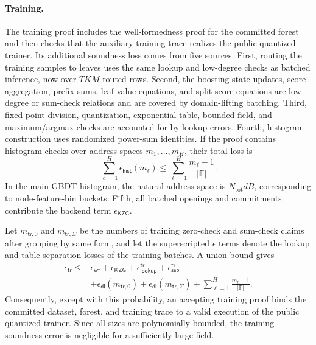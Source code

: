 \paragraph{Training.}
The training proof includes the well-formedness proof for the committed forest
and then checks that the auxiliary training trace realizes the public
quantized trainer.  Its additional soundness loss comes from five sources.
First, routing the training samples to leaves uses the same lookup and
low-degree checks as batched inference, now over $TKM$ routed rows.  Second,
the boosting-state updates, score aggregation, prefix sums, leaf-value
equations, and split-score equations are low-degree or sum-check relations and
are covered by domain-lifting batching.  Third, fixed-point division,
quantization, exponential-table, bounded-field, and maximum/argmax checks are
accounted for by lookup errors.  Fourth, histogram construction uses randomized
power-sum identities.  If the proof contains histogram checks over address
spaces $m_1,\ldots,m_H$, their total loss is
\[
    \sum_{\ell=1}^{H}\epsilon_{\mathsf{hist}}(m_\ell)
    \leq
    \sum_{\ell=1}^{H}\frac{m_\ell-1}{|\mathbb{F}|}.
\]
In the main GBDT histogram, the natural address space is
$N_{\mathrm{tot}}dB$, corresponding to node-feature-bin buckets.  Fifth, all
batched openings and commitments contribute the backend term
$\epsilon_{\mathsf{KZG}}$.

Let $m_{\mathsf{tr},0}$ and $m_{\mathsf{tr},\Sigma}$ be the numbers of
training zero-check and sum-check claims after grouping by same form, and let
the superscripted $\epsilon$ terms denote the lookup and table-separation losses
of the training batches.  A union bound gives
\[
\begin{aligned}
\epsilon_{\mathsf{tr}}
\leq{}&
\epsilon_{\mathsf{wf}}
+\epsilon_{\mathsf{KZG}}
+\epsilon_{\mathsf{lookup}}^{\mathsf{tr}}
+\epsilon_{\mathsf{sep}}^{\mathsf{tr}} \\
&+\epsilon_{\mathsf{dl}}(m_{\mathsf{tr},0})
+\epsilon_{\mathsf{dl}}(m_{\mathsf{tr},\Sigma})
+\sum_{\ell=1}^{H}\frac{m_\ell-1}{|\mathbb{F}|}.
\end{aligned}
\]
Consequently, except with this probability, an accepting training proof binds
the committed dataset, forest, and training trace to a valid execution of the
public quantized trainer.
Since all sizes are polynomially bounded,
the training soundness error is negligible for a sufficiently large field.
